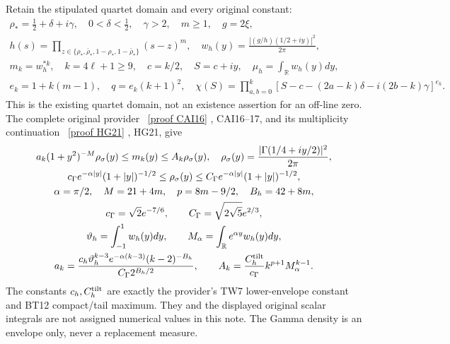 \documentclass[11pt]{article}
\newcommand{\R}{\mathbb R}
\begin{document}
Retain the stipulated quartet domain and every original constant:
\begin{equation}\label{eq:objects}
\begin{gathered}
 \rho_*=\tfrac12+\delta+i\gamma,\quad 0<\delta<\tfrac12,
 \quad\gamma>2,\quad m\ge1,\quad g=2\xi,\\
 h(s)=\prod_{z\in\{\rho_*,\bar\rho_*,1-\rho_*,1-\bar\rho_*\}}(s-z)^m,
 \quad w_h(y)=\frac{|(g/h)(1/2+iy)|^2}{2\pi},\\
 m_k=w_h^{*k},\quad k=4\ell+1\ge9,\quad
 c=k/2,\quad S=c+iy,\quad \mu_h=\int_\R w_h(y)dy,\\
 e_k=1+k(m-1),\quad q=e_k(k+1)^2,\quad
 \chi(S)=\prod_{a,b=0}^k
 [S-c-(2a-k)\delta-i(2b-k)\gamma]^{e_k}.
\end{gathered}
\end{equation}
This is the existing quartet domain, not an existence assertion for
an off-line zero. The complete original provider \cite{CAI}%
~\href{https://github.com/KokunoYumeto/zeta-function-research-reader/blob/487253b5b01851da5b9b98af4e146fecf1fab902/workbenches/splitzero-tandem/continuations/20260919-full-window-source-products/providers/CAI_COMPLETE_PREREQUISITE.tex\#L284}{[proof CAI16]}%
{},
CAI16--17, and its multiplicity continuation \cite{HG}%
~\href{https://github.com/KokunoYumeto/zeta-function-research-reader/blob/5992ad50c0f2a06921f1fcaded7b4e38097c0739/workbenches/splitzero-tandem/continuations/20260920-original-kernel-mixed-determinants/providers/HEAT_GROWTH_AND_ORIGINAL_CURRENTS.tex\#L374}{[proof HG21]}%
{}, HG21, give
\begin{equation}\label{eq:envelope}
\begin{gathered}
 a_k(1+y^2)^{-M}\rho_\sigma(y)\le m_k(y)\le A_k\rho_\sigma(y),
 \quad \rho_\sigma(y)=\frac{|\Gamma(1/4+iy/2)|^2}{2\pi},\\
 c_\Gamma e^{-\alpha|y|}(1+|y|)^{-1/2}
 \le\rho_\sigma(y)\le
 C_\Gamma e^{-\alpha|y|}(1+|y|)^{-1/2},\\
 \alpha=\pi/2,\quad M=21+4m,\quad p=8m-9/2,\quad B_h=42+8m,\\
 c_\Gamma=\sqrt2e^{-7/6},\qquad C_\Gamma=\sqrt{2\sqrt5}e^{2/3},\\
 \vartheta_h=\int_{-1}^1w_h(y)dy,\qquad
 M_\alpha=\int_\R e^{\alpha y}w_h(y)dy,\\
 a_k=\frac{c_h\vartheta_h^{k-3}e^{-\alpha(k-3)}(k-2)^{-B_h}}
 {C_\Gamma2^{B_h/2}},\qquad
 A_k=\frac{C_h^{\rm tilt}}{c_\Gamma}k^{p+1}M_\alpha^{k-1}.
\end{gathered}
\end{equation}
The constants $c_h,C_h^{\rm tilt}$ are exactly the provider's TW7
lower-envelope constant and BT12 compact/tail maximum. They and the
displayed original scalar integrals are not assigned numerical values
in this note. The Gamma density is an envelope only, never a
replacement measure.
\end{document}
